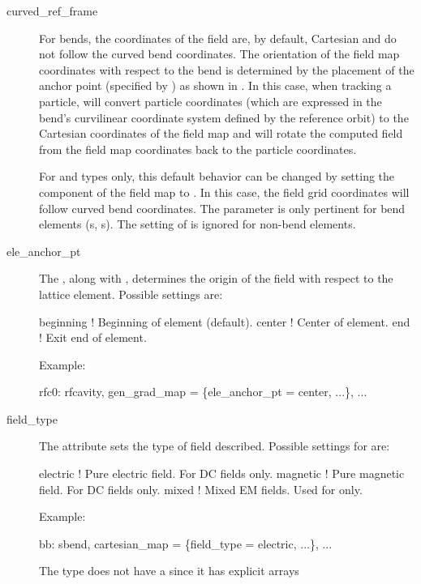   \begin{description}
  \item[curved_ref_frame] \Newline
For bends, the coordinates of the field are, by default, Cartesian and do not follow the
curved bend coordinates. The orientation of the field map coordinates with respect to the
bend is determined by the placement of the anchor point (specified by )
as shown in . In this case, when tracking a particle, \bmad will convert
particle coordinates (which are expressed in the bend's curvilinear coordinate system
defined by the reference orbit) to the Cartesian coordinates of the field map and will
rotate the computed field from the field map coordinates back to the particle coordinates.

For  and  types only, this default behavior can be changed by
setting the  component of the field map to . In this case,
the field grid coordinates will follow curved bend coordinates.  The 
parameter is only pertinent for bend elements (s, s).  The setting of
 is ignored for non-bend elements.
  \item[ele_anchor_pt] \Newline
The , along with , determines the origin of the field with
respect to the lattice element. Possible settings are:
\begin{example}
  beginning   ! Beginning of element (default).
  center      ! Center of element.
  end         ! Exit end of element.
\end{example}
Example:
\begin{example}
  rfc0: rfcavity, gen_grad_map = \{ele_anchor_pt = center, ...\}, ...
\end{example}
  \item[field_type] \Newline
The  attribute sets the type of field described. Possible settings for
 are:
\begin{example}
  electric      ! Pure electric field. For DC fields only.
  magnetic      ! Pure magnetic field. For DC fields only.
  mixed         ! Mixed EM fields. Used for  only.
\end{example}
Example:
\begin{example}
  bb: sbend, cartesian_map = \{field_type = electric, ...\}, ...
\end{example}
The  type does not have a  since it has explicit arrays

\end{description}
